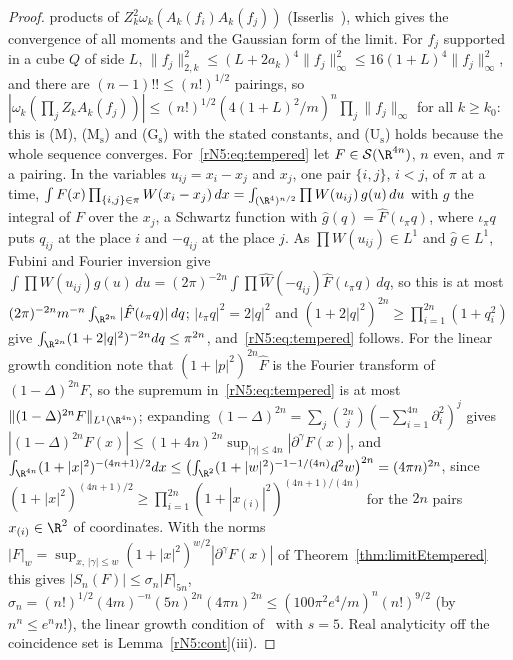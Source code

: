 \begin{proof}
products of $Z_k^2\omega_k(A_k(f_i)A_k(f_j))$ (Isserlis~\cite{Iss18}), which
gives the convergence of all moments and the Gaussian form of the limit.
For $f_j$ supported in a cube $Q$ of side $L$, $\|f_j\|_{2,k}^2\le(L+2a_k)^4
\|f_j\|_\infty^2\le16(1+L)^4\|f_j\|_\infty^2$, and there are $(n-1)!!\le
(n!)^{1/2}$ pairings, so $|\omega_k(\prod_jZ_kA_k(f_j))|\le(n!)^{1/2}(4(1+L)^2/
m)^n\prod_j\|f_j\|_\infty$ for all $k\ge k_0$: this is (M), (M$_{\mathrm s}$)
and (G$_{\mathrm s}$) with the stated constants, and (U$_{\mathrm s}$) holds
because the whole sequence converges. For~\eqref{rN5:eq:tempered} let $F\in
\mathcal S(\R^{4n})$, $n$ even, and $\pi$ a pairing. In the variables
$u_{ij}=x_i-x_j$ and $x_j$, one pair $\{i,j\}$, $i<j$, of $\pi$ at a time,
$\int F(x)\prod_{\{i,j\}\in\pi}W(x_i-x_j)\,dx=\int_{(\R^4)^{n/2}}\prod W(u_{ij})
\,g(u)\,du$ with $g$ the integral of $F$ over the $x_j$, a Schwartz function
with $\hat g(q)=\hat F(\iota_\pi q)$, where $\iota_\pi q$ puts $q_{ij}$ at
the place $i$ and $-q_{ij}$ at the place $j$. As $\prod W(u_{ij})\in L^1$ and
$\hat g\in L^1$, Fubini and Fourier inversion give $\int\prod W(u_{ij})g(u)
\,du=(2\pi)^{-2n}\int\prod\hat W(-q_{ij})\hat F(\iota_\pi q)\,dq$, so this is at
most $(2\pi)^{-2n}m^{-n}\int_{\R^{2n}}|\hat F(\iota_\pi q)|\,dq$; $|\iota_\pi q|^2=2|q|^2$
and $(1+2|q|^2)^{2n}\ge\prod_{i=1}^{2n}(1+q_i^2)$ give $\int_{\R^{2n}}(1+2|q|^2)
^{-2n}dq\le\pi^{2n}$, and~\eqref{rN5:eq:tempered} follows. For the linear
growth condition note that $(1+|p|^2)^{2n}\hat F$ is the Fourier transform of
$(1-\Delta)^{2n}F$, so the supremum in~\eqref{rN5:eq:tempered} is at most
$\|(1-\Delta)^{2n}F\|_{L^1(\R^{4n})}$; expanding $(1-\Delta)^{2n}=\sum_j\binom
{2n}j(-\sum_{i=1}^{4n}\partial_i^2)^j$ gives $|(1-\Delta)^{2n}F(x)|\le(1+4n)^{2n}
\sup_{|\gamma|\le4n}|\partial^\gamma F(x)|$, and $\int_{\R^{4n}}(1+|x|^2)^{-(4n+1)
/2}dx\le\bigl(\int_{\R^2}(1+|w|^2)^{-1-1/(4n)}d^2w\bigr)^{2n}=(4\pi n)^{2n}$,
since $(1+|x|^2)^{(4n+1)/2}\ge\prod_{i=1}^{2n}(1+|x_{(i)}|^2)^{(4n+1)/(4n)}$
for the $2n$ pairs $x_{(i)}\in\R^2$ of coordinates. With the norms $|F|_w=
\sup_{x,\,|\gamma|\le w}(1+|x|^2)^{w/2}|\partial^\gamma F(x)|$ of
Theorem~\ref{thm:limitEtempered} this gives $|S_n(F)|\le\sigma_n|F|_{5n}$, $\sigma_n=
(n!)^{1/2}(4m)^{-n}(5n)^{2n}(4\pi n)^{2n}\le(100\pi^2e^4/m)^n(n!)^{9/2}$
\textup{(}by $n^n\le e^nn!$\textup{)},
the linear growth condition of~\cite{OS75} with $s=5$. Real analyticity
off the coincidence set is Lemma~\ref{rN5:cont}(iii).


\end{proof}
